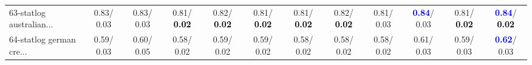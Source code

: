 \begin{table}[h]
\begin{center}
{\begin{tabular}{lc|c|c|c|c|c|c|c|c|c|c}
63-statlog australian... &   0.83/  0.03 &   0.83/  0.03 &   0.81/\textcolor{black}{\textbf{  0.02}} &   0.82/\textcolor{black}{\textbf{  0.02}} &   0.81/\textcolor{black}{\textbf{  0.02}} &   0.81/\textcolor{black}{\textbf{  0.02}} &   0.82/\textcolor{black}{\textbf{  0.02}} &   0.81/  0.03 & \textcolor{blue}{\textbf{  0.84}}/  0.03 &   0.81/\textcolor{black}{\textbf{  0.02}} & \textcolor{blue}{\textbf{  0.84}}/\textcolor{black}{\textbf{  0.02}} \\
64-statlog german cre... &   0.59/  0.03 &   0.60/  0.05 &   0.58/  0.02 &   0.59/  0.02 &   0.59/  0.02 &   0.58/  0.02 &   0.58/  0.02 &   0.58/  0.02 &   0.61/  0.03 &   0.59/  0.03 & \textcolor{blue}{\textbf{  0.62}}/  0.03 \\\end{tabular}
}\label{strats1aRFw}
\end{center}
\end{table}

